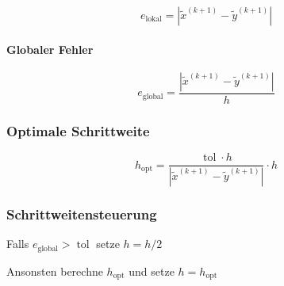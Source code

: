 \documentclass[a4paper, twoside]{article}
\begin{document}
\[e_{\text{lokal}} = |\tilde{x}^{(k+1)} - \tilde{y}^{(k+1)}|\]

\paragraph{Globaler Fehler}

\[e_{\text{global}} = \frac{|\tilde{x}^{(k+1)} - \tilde{y}^{(k+1)}|}{h}\]

\subsubsection{Optimale Schrittweite}

\[h_{\text{opt}} = \frac{\operatorname{tol} \cdot h}{|\tilde{x}^{(k+1)} - \tilde{y}^{(k+1)}|} \cdot h\]

\subsubsection{Schrittweitensteuerung}

Falls \(e_{\text{global}} > \operatorname{tol}\) setze \(h = h/2\)

Ansonsten berechne \(h_{\text{opt}}\) und setze \(h = h_{\text{opt}}\)
\end{document}
